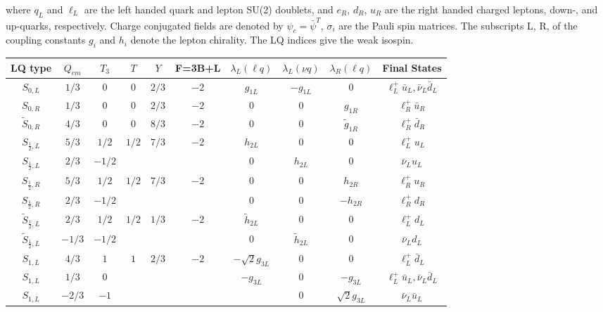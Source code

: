 where $q_L$ and $\ell_L$ are the left handed quark and lepton SU(2) doublets, and $e_R$, $d_R$, $u_R$ are the right handed charged leptons, down-, and up-quarks, respectively.  Charge conjugated fields are denoted by $\psi_c=\bar{\psi}^T$, $\sigma_i$ are the Pauli spin matrices.  The subscripts L, R, of the coupling constants $g_{i}$ and $h_{i}$ denote the lepton chirality.  The LQ indices give the weak isospin.  



\begin{table}[!Hhtbp]
\begin{tabular}{|c|ccccc|ccc|c|}
\hline
{LQ type}  & {$Q_{em}$}& {$T_{3}$}& {$T$} &{$Y$}& {F=3B+L}& {$\lambda_{L}(\ell q)$}& {$\lambda_{L}(\nu q)$}& {$\lambda_{R}(\ell q)$}&{Final States}\\
\hline
\hline
{$S_{0,L}$}  & {$1/3$}& {$0$}& {$0$} &{$2/3$}& {$-2$}& {$g_{1L}$}& {$-g_{1L}$}& {$0$}&{$\ell^{+}_{L}\bar{u}_{L},\bar{\nu}_{L}\bar{d}_{L}$}\\
\hline
{$S_{0,R}$}  & {$1/3$}& {$0$}& {$0$} &{$2/3$}& {$-2$}& {$0$}& {$0$}& {$g_{1R}$}&{$\ell^{+}_{R}\bar{u}_{R}$}\\
\hline
{$\tilde{S}_{0,R}$}  & {$4/3$}& {$0$}& {$0$} &{$8/3$}& {$-2$}& {$0$}& {$0$}& {$\tilde{g}_{1R}$}&{$\ell^{+}_{R}\bar{d}_{R}$}\\
\hline
{$S_{\frac{1}{2},L}$}  & {$5/3$}& {$1/2$} & \multirow{2}{*}{$1/2$}&\multirow{2}{*}{$7/3$}& \multirow{2}{*}{$-2$}& {$h_{2L}$}& {$0$}& {$0$}&{$\ell^{+}_{L}u_{L}$}\\
{$S_{\frac{1}{2},L}$}  & {$2/3$}& {$-1/2$} & {}&{}& {}& {$0$}& {$h_{2L}$}& {$0$}&{$\bar{\nu}_{L}u_{L}$}\\
\hline
{$S_{\frac{1}{2},R}$}  & {$5/3$}& {$1/2$} & \multirow{2}{*}{$1/2$}&\multirow{2}{*}{$7/3$}& \multirow{2}{*}{$-2$}& {$0$}& {$0$}& {$h_{2R}$}&{$\ell^{+}_{R}u_{R}$}\\
{$S_{\frac{1}{2},R}$}  & {$2/3$}& {$-1/2$} & {}&{}& {}& {$0$}& {$0$}& {$-h_{2R}$}&{$\ell^{+}_{R}d_{R}$}\\
\hline
{$\tilde{S}_{\frac{1}{2},L}$}  & {$2/3$}& {$1/2$} & \multirow{2}{*}{$1/2$}&\multirow{2}{*}{$1/3$}& \multirow{2}{*}{$-2$}& {$\tilde{h}_{2L}$}& {$0$}& {$0$}&{$\ell^{+}_{L}d_{L}$}\\
{$\tilde{S}_{\frac{1}{2},L}$}  & {$-1/3$}& {$-1/2$} & {}&{}& {}& {$0$}& {$\tilde{h}_{2L}$}& {$0$}&{$\bar{\nu}_{L}d_{L}$}\\
\hline
{$S_{1,L}$}  &{$4/3$}& {$1$} & \multirow{3}{*}{$1$}&\multirow{3}{*}{$2/3$}& \multirow{3}{*}{$-2$}& {$-\sqrt{2}g_{3L}$}& {$0$}& {$0$}&{$\ell^{+}_{L}\bar{d}_{L}$}\\
{$S_{1,L}$}  &{$1/3$}& {$0$} &&&& {$-g_{3L}$}& {$0$}& {$-g_{3L}$}&{$\ell^{+}_{L}\bar{u}_{L},\bar{\nu}_{L}\bar{d}_{L}$}\\
{$S_{1,L}$}  &{$-2/3$}& {$-1$} &&&& {$$}& {$0$}& {$\sqrt{2}g_{3L}$}&{$\bar{\nu}_{L}\bar{u}_{L}$}\\


\end{tabular}
\end{table}
